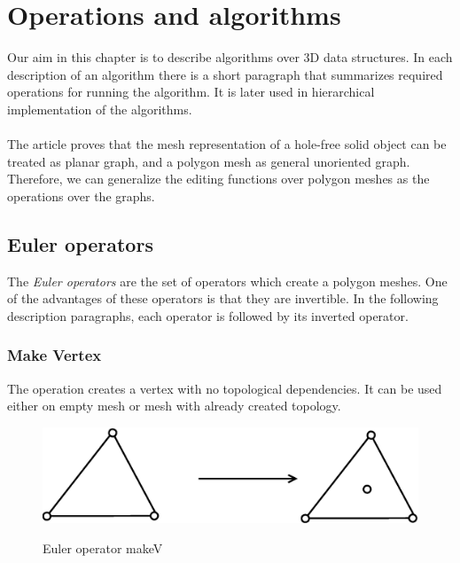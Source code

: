 \chapter{Operations and algorithms}

\label{chap:op_al}

Our aim in this chapter is to describe algorithms over 3D data structures. In each description of
an algorithm there is a short paragraph that summarizes required operations for running the algorithm.
It is later used in hierarchical implementation of the algorithms.\\
\\
The article\cite{Grunbaum2007} proves that the mesh representation of a hole-free solid object can be
treated as planar graph, and a polygon mesh as general unoriented graph. Therefore, we can generalize the
editing functions over polygon meshes as the operations over the graphs.\\

\section{Euler operators}
\label{sec:euler}

The \emph{Euler operators} are the set of operators which create a polygon meshes\cite{Havemann2005}. One of the advantages
of these operators is that they are invertible. In the following description paragraphs,
each operator is followed by its inverted operator.

\subsection{Make Vertex}

The operation creates a vertex with no topological dependencies. It can be used
either on empty mesh or mesh with already created topology.

\begin{figure}[h]
\centering
\includegraphics[scale=0.25]{../img/makeV.eps}
\label{fig:makev}
\caption{Euler operator makeV}
\end{figure}


